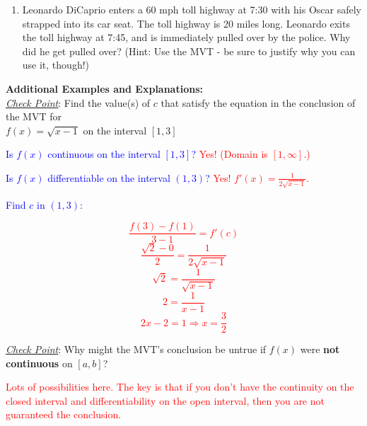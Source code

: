 \documentclass[12pt]{report}
\begin{document}
\begin{enumerate}
\begin{multicols}{3}

\item $[0,6]$

\item $(-6,0]$

\item $[6, 12]$

\end{multicols}

\vspace{1.5 in}

\item Leonardo DiCaprio enters a 60 mph toll highway at 7:30 with his Oscar safely strapped into its car seat.  The toll highway is 20 miles long.  Leonardo exits the toll highway at 7:45, and is immediately pulled over by the police.  Why did he get pulled over?  (Hint: Use the MVT - be sure to justify why you can use it, though!)

\end{enumerate}

\newpage

\textbf{Additional Examples and Explanations:} \\

\emph{\underline{Check Point}}: Find the value(s) of $c$ that satisfy the equation in the conclusion of the MVT for\\
$f(x)=\sqrt{x-1}$ on the interval $[1,3]$

\bigskip

\textcolor{blue}{Is $f(x)$ continuous on the interval $[1,3]$?} \textcolor{red}{Yes! (Domain is $[1,\infty]$.)}

\textcolor{blue}{Is $f(x)$ differentiable on the interval $(1,3)$?} \textcolor{red}{Yes! $f'(x)=\displaystyle\frac{1}{2\sqrt{x-1}}$.}

\textcolor{blue}{Find $c$ in $(1,3)$:} 

\textcolor{red}{$$\frac{f(3)-f(1)}{3-1}=f'(c)$$}
\textcolor{red}{$$\frac{\sqrt{2}-0}{2}=\displaystyle\frac{1}{2\sqrt{x-1}}$$}
\textcolor{red}{$$\sqrt{2}=\displaystyle\frac{1}{\sqrt{x-1}}$$}
\textcolor{red}{$$2=\frac{1}{x-1}$$}
\textcolor{red}{$$2x-2=1\Rightarrow x=\frac{3}{2}$$}

\bigskip

\emph{\underline{Check Point}}: Why might the MVT's conclusion be untrue if $f(x)$ were \textbf{not continuous} on $[a,b]$?

\textcolor{red}{Lots of possibilities here.  The key is that if you don't have the continuity on the closed interval and differentiability on the open interval, then you are not guaranteed the conclusion.}
\end{document}

